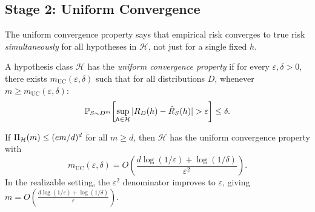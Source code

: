 
\subsection{Stage 2: Uniform Convergence}
\label{sec:uniform-convergence}

The uniform convergence property says that empirical risk converges to true risk
\emph{simultaneously} for all hypotheses in $\mathcal{H}$, not just for a
single fixed $h$.

\begin{defn}
\label{def:unif-conv}
  \leanok
A hypothesis class $\mathcal{H}$ has the \emph{uniform convergence property}
if for every $\varepsilon, \delta > 0$, there exists
$m_{\mathrm{UC}}(\varepsilon, \delta)$ such that for all distributions $D$,
whenever $m \geq m_{\mathrm{UC}}(\varepsilon, \delta)$:
\[
  \mathbb{P}_{S \sim D^m}\!\left[
    \sup_{h \in \mathcal{H}} |R_D(h) - \hat{R}_S(h)| > \varepsilon
  \right] \leq \delta.
\]
\end{defn}

\begin{thm}
\label{thm:unif-conv}
If $\Pi_\mathcal{H}(m) \leq (em/d)^d$ for all $m \geq d$, then
$\mathcal{H}$ has the uniform convergence property with
\[
  m_{\mathrm{UC}}(\varepsilon, \delta)
  = O\!\left(\frac{d \log(1/\varepsilon) + \log(1/\delta)}{\varepsilon^2}\right).
\]
In the realizable setting, the $\varepsilon^2$ denominator improves to
$\varepsilon$, giving $m = O\!\left(\frac{d\log(1/\varepsilon) +
\log(1/\delta)}{\varepsilon}\right)$.
\end{thm}


